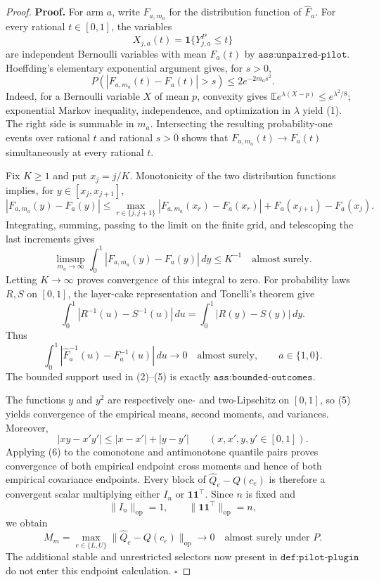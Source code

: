 \documentclass{article}
\begin{document}
\begin{proof}
\textbf{Proof.}
For arm \(a\), write \(F_{a,m_a}\) for the distribution function of \(\widehat F_a\).  For every rational \(t\in[0,1]\), the variables
\[
X_{j,a}(t)=\mathbf 1\{Y^P_{j,a}\le t\}
\]
are independent Bernoulli variables with mean \(F_a(t)\) by \(\texttt{ass:unpaired-pilot}\).  Hoeffding's elementary exponential argument gives, for \(s>0\),
\[
P\!\left(\left|F_{a,m_a}(t)-F_a(t)\right|>s\right)
\le 2e^{-2m_as^2}.
\tag{1}
\]
Indeed, for a Bernoulli variable \(X\) of mean \(p\), convexity gives
\(\mathbb E e^{\lambda(X-p)}\le e^{\lambda^2/8}\); exponential Markov inequality, independence, and optimization in \(\lambda\) yield (1).  The right side is summable in \(m_a\).  Intersecting the resulting probability-one events over rational \(t\) and rational \(s>0\) shows that \(F_{a,m_a}(t)\to F_a(t)\) simultaneously at every rational \(t\).

Fix \(K\ge1\) and put \(x_j=j/K\).  Monotonicity of the two distribution functions implies, for \(y\in[x_j,x_{j+1}]\),
\[
|F_{a,m_a}(y)-F_a(y)|
\le \max_{r\in\{j,j+1\}}|F_{a,m_a}(x_r)-F_a(x_r)|
+F_a(x_{j+1})-F_a(x_j).
\tag{2}
\]
Integrating, summing, passing to the limit on the finite grid, and telescoping the last increments gives
\[
\limsup_{m_a\to\infty}\int_0^1|F_{a,m_a}(y)-F_a(y)|\,dy\le K^{-1}
\quad\text{almost surely}.
\tag{3}
\]
Letting \(K\to\infty\) proves convergence of this integral to zero.  For probability laws \(R,S\) on \([0,1]\), the layer-cake representation and Tonelli's theorem give
\[
\int_0^1|R^{-1}(u)-S^{-1}(u)|\,du
=\int_0^1|R(y)-S(y)|\,dy.
\tag{4}
\]
Thus
\[
\int_0^1|\widehat F_a^{-1}(u)-F_a^{-1}(u)|\,du\longrightarrow0
\quad\text{almost surely},\qquad a\in\{1,0\}.
\tag{5}
\]
The bounded support used in (2)--(5) is exactly \(\texttt{ass:bounded-outcomes}\).

The functions \(y\) and \(y^2\) are respectively one- and two-Lipschitz on \([0,1]\), so (5) yields convergence of the empirical means, second moments, and variances.  Moreover,
\[
|xy-x'y'|\le |x-x'|+|y-y'|
\qquad(x,x',y,y'\in[0,1]).
\tag{6}
\]
Applying (6) to the comonotone and antimonotone quantile pairs proves convergence of both empirical endpoint cross moments and hence of both empirical covariance endpoints.  Every block of \(\widehat Q_e-Q(c_e)\) is therefore a convergent scalar multiplying either \(I_n\) or \(\mathbf1\mathbf1^{\top}\).  Since \(n\) is fixed and
\[
\lVert I_n\rVert_{\mathrm{op}}=1,
\qquad \lVert\mathbf1\mathbf1^{\top}\rVert_{\mathrm{op}}=n,
\tag{7}
\]
we obtain
\[
M_m=\max_{e\in\{L,U\}}\lVert\widehat Q_e-Q(c_e)\rVert_{\mathrm{op}}
\longrightarrow0
\quad\text{almost surely under }P.
\]
The additional stable and unrestricted selectors now present in \(\texttt{def:pilot-plugin}\) do not enter this endpoint calculation. \(\square\)
\end{proof}
\end{document}
